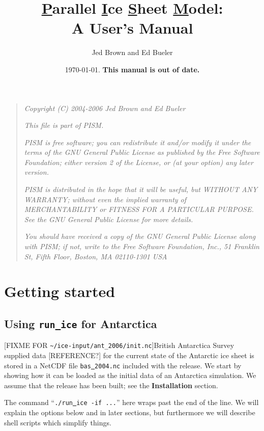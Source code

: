 \documentclass[11pt,final]{amsart}
\title[PISM User's Manual]{\underline{P}arallel \underline{I}ce \underline{S}heet \underline{M}odel: \\ A User's Manual}
\author{Jed Brown and Ed Bueler}
\date{\today.  \textbf{This manual is out of date.}}
\newcommand{\normalspacing}{\renewcommand{\baselinestretch}{1.1}\tiny\normalsize}
\newcommand{\tablespacing}{\renewcommand{\baselinestretch}{1.0}\tiny\normalsize}
\renewcommand{\t}[1]{\texttt{#1}}
\begin{document}
\maketitle
\tablespacing
\tableofcontents

\newpage
\phantom{bob}
\vspace{2in}
\begin{quote}
\textsl{Copyright (C) 2004-2006 Jed Brown and Ed Bueler}
\medskip

\noindent \textsl{This file is part of PISM.}
\medskip

\noindent \textsl{PISM is free software; you can redistribute it and/or modify it under the terms of the GNU General Public License as published by the Free Software Foundation; either version 2 of the License, or (at your option) any later version.}
\medskip

\noindent \textsl{PISM is distributed in the hope that it will be useful, but WITHOUT ANY WARRANTY; without even the implied warranty of MERCHANTABILITY or FITNESS FOR A PARTICULAR PURPOSE.  See the GNU General Public License for more details.}
\medskip

\noindent \textsl{You should have received a copy of the GNU General Public License along with PISM; if not, write to the Free Software Foundation, Inc., 51 Franklin St, Fifth Floor, Boston, MA  02110-1301 USA}
\end{quote}
\vspace{1in}
\normalspacing

\newpage
\section{Getting started}

\subsection{Using \t{run\underline{ }ice} for Antarctica}  [FIXME FOR \verb|~/ice-input/ant_2006/init.nc|]British Antarctica Survey supplied data [REFERENCE?] for the current state of the Antarctic ice sheet is stored in a NetCDF file \t{bas\underline{ }2004.nc} included with the release.  We start by showing how it can be loaded as the initial data of an Antarctica simulation.  We assume that the release has been built; see the \textbf{Installation} section.

The command ``\t{./run\underline{ }ice -if ...}'' here wraps past the end of the line.  We will explain the options below and in later sections, but furthermore we will describe shell scripts which simplify things.
\end{document}
